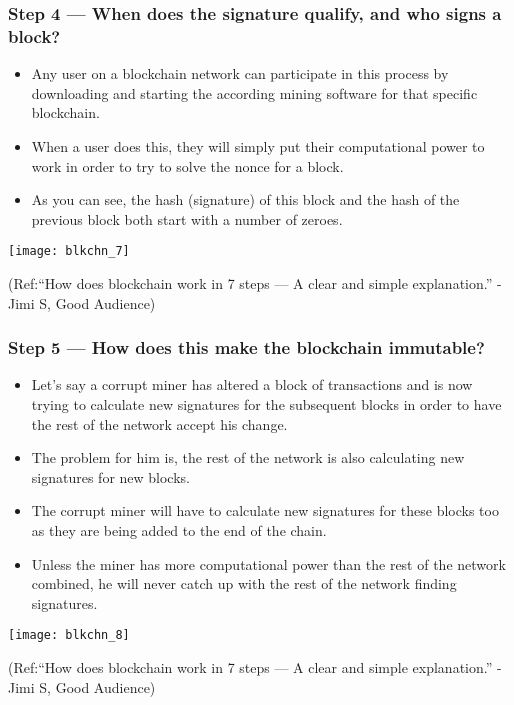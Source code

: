 \begin{frame}[fragile]\frametitle{Step 4 — When does the signature qualify, and who signs a block?}
\begin{itemize}
\item Any user on a blockchain network can participate in this process by downloading and starting the according mining software for that specific blockchain. 
\item When a user does this, they will simply put their computational power to work in order to try to solve the nonce for a block.
\item As you can see, the hash (signature) of this block and the hash of the previous block both start with a number of zeroes. 
\end{itemize}

\begin{center}
\texttt{[image: blkchn\_7]}

{\tiny (Ref:``How does blockchain work in 7 steps — A clear and simple explanation.'' - Jimi S, Good Audience)}
\end{center}

\end{frame}

\begin{frame}[fragile]\frametitle{Step 5 — How does this make the blockchain immutable?}
\begin{itemize}
\item Let’s say a corrupt miner has altered a block of transactions and is now trying to calculate new signatures for the subsequent blocks in order to have the rest of the network accept his change. 
\item The problem for him is, the rest of the network is also calculating new signatures for new blocks. 
\item The corrupt miner will have to calculate new signatures for these blocks too as they are being added to the end of the chain.
\item Unless the miner has more computational power than the rest of the network combined, he will never catch up with the rest of the network finding signatures.
\end{itemize}

\begin{center}
\texttt{[image: blkchn\_8]}

{\tiny (Ref:``How does blockchain work in 7 steps — A clear and simple explanation.'' - Jimi S, Good Audience)}
\end{center}

\end{frame}

